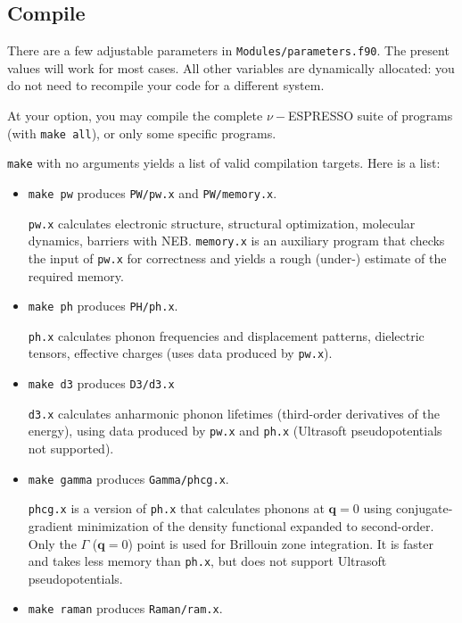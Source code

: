 \documentclass[12pt,a4paper]{article}
\begin{document}
\subsection{Compile}

There are a few adjustable parameters in
\texttt{Modules/parameters.f90}.
The present values will work for most cases.  All other variables are
dynamically allocated: you do not need to recompile your code for a
different system.

At your option, you may compile the complete $\nu-$ESPRESSO suite of
programs (with \texttt{make all}), or only some specific programs.

\texttt{make} with no arguments yields a list of valid compilation
targets.
Here is a list:

\begin{itemize}
  \item
    \texttt{make pw} produces \texttt{PW/pw.x} and
    \texttt{PW/memory.x}.

    \texttt{pw.x} calculates electronic structure, structural
    optimization, molecular dynamics, barriers with NEB.
    \texttt{memory.x} is an auxiliary program that checks the input of
    \texttt{pw.x} for correctness and yields a rough (under-) estimate
    of the required memory.
  \item
    \texttt{make ph} produces \texttt{PH/ph.x}.

    \texttt{ph.x} calculates phonon frequencies and displacement
    patterns, dielectric tensors, effective charges (uses data
    produced by \texttt{pw.x}).
  \item
    \texttt{make d3} produces \texttt{D3/d3.x}

    \texttt{d3.x} calculates anharmonic phonon lifetimes (third-order
    derivatives of the energy), using data produced by \texttt{pw.x}
    and \texttt{ph.x} (Ultrasoft pseudopotentials not supported).
  \item
    \texttt{make gamma} produces \texttt{Gamma/phcg.x}.

    \texttt{phcg.x} is a version of \texttt{ph.x} that calculates
    phonons at $\mathbf{q}=0$ using conjugate-gradient minimization of
    the density functional expanded to second-order.
    Only the $\Gamma$ ($\mathbf{q}=0$) point is used for Brillouin
    zone integration.
    It is faster and takes less memory than \texttt{ph.x}, but does
    not support Ultrasoft pseudopotentials.
  \item
    \texttt{make raman} produces \texttt{Raman/ram.x}.


\end{itemize}
\end{document}
